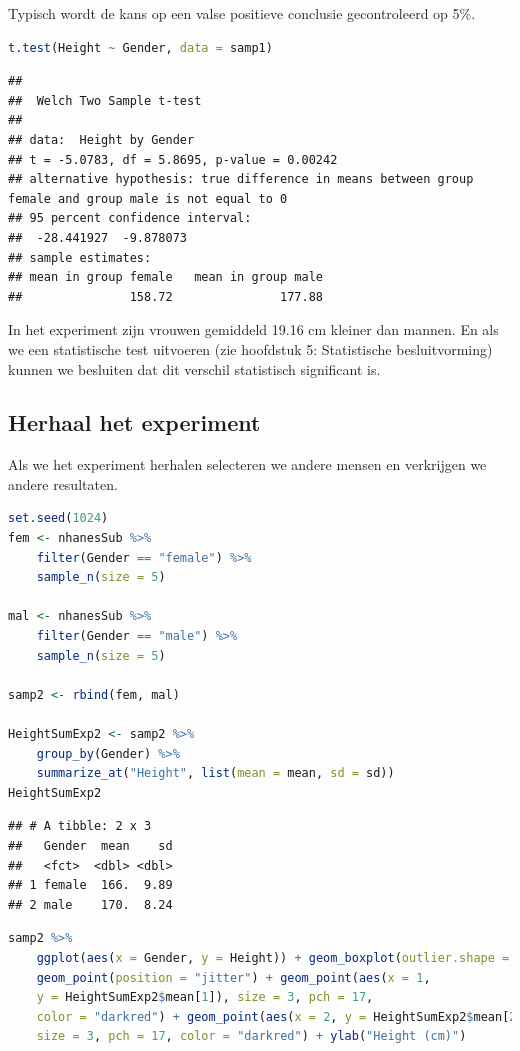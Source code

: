 \documentclass[
  12pt,dutch,coursenotes]{book}
\begin{document}
Typisch wordt de kans op een valse positieve conclusie gecontroleerd op 5\%.

\begin{lstlisting}[language=R]
t.test(Height ~ Gender, data = samp1)
\end{lstlisting}

\begin{lstlisting}
## 
##  Welch Two Sample t-test
## 
## data:  Height by Gender
## t = -5.0783, df = 5.8695, p-value = 0.00242
## alternative hypothesis: true difference in means between group female and group male is not equal to 0
## 95 percent confidence interval:
##  -28.441927  -9.878073
## sample estimates:
## mean in group female   mean in group male 
##               158.72               177.88
\end{lstlisting}

In het experiment zijn vrouwen gemiddeld 19.16 cm kleiner dan mannen. En als we een statistische test uitvoeren (zie hoofdstuk 5: Statistische besluitvorming) kunnen we besluiten dat dit verschil statistisch significant is.

\hypertarget{herhaal-het-experiment}{%
\subsection{Herhaal het experiment}\label{herhaal-het-experiment}}

Als we het experiment herhalen selecteren we andere mensen en verkrijgen we andere resultaten.

\begin{lstlisting}[language=R]
set.seed(1024)
fem <- nhanesSub %>%
    filter(Gender == "female") %>%
    sample_n(size = 5)

mal <- nhanesSub %>%
    filter(Gender == "male") %>%
    sample_n(size = 5)

samp2 <- rbind(fem, mal)

HeightSumExp2 <- samp2 %>%
    group_by(Gender) %>%
    summarize_at("Height", list(mean = mean, sd = sd))
HeightSumExp2
\end{lstlisting}

\begin{lstlisting}
## # A tibble: 2 x 3
##   Gender  mean    sd
##   <fct>  <dbl> <dbl>
## 1 female  166.  9.89
## 2 male    170.  8.24
\end{lstlisting}

\begin{lstlisting}[language=R]
samp2 %>%
    ggplot(aes(x = Gender, y = Height)) + geom_boxplot(outlier.shape = NA) +
    geom_point(position = "jitter") + geom_point(aes(x = 1,
    y = HeightSumExp2$mean[1]), size = 3, pch = 17,
    color = "darkred") + geom_point(aes(x = 2, y = HeightSumExp2$mean[2]),
    size = 3, pch = 17, color = "darkred") + ylab("Height (cm)")
\end{lstlisting}
\end{document}
